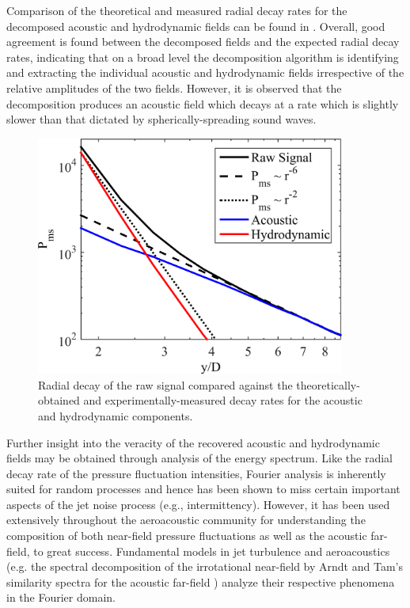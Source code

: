 Comparison of the theoretical and measured radial decay rates for the decomposed acoustic and hydrodynamic fields can be found in .
Overall, good agreement is found between the decomposed fields and the expected radial decay rates, indicating that on a broad level the decomposition algorithm is identifying and extracting the individual acoustic and hydrodynamic fields irrespective of the relative amplitudes of the two fields.
However, it is observed that the decomposition produces an acoustic field which decays at a rate which is slightly slower than that dictated by spherically-spreading sound waves. 
\begin{figure}
	\centering
	\includegraphics[width=4in]{Figures/ch3_validation_Pms.png}
	\caption{Radial decay of the raw signal compared against the theoretically-obtained and experimentally-measured decay rates for the acoustic and hydrodynamic components.}
	\label{fig:ch3_validation_Pms}
\end{figure}

Further insight into the veracity of the recovered acoustic and hydrodynamic fields may be obtained through analysis of the energy spectrum.
Like the radial decay rate of the pressure fluctuation intensities, Fourier analysis is inherently suited for random processes and hence has been shown to miss certain important aspects of the jet noise process (e.g.,  intermittency). 
However, it has been used extensively throughout the aeroacoustic community for understanding the composition of both near-field pressure fluctuations as well as the acoustic far-field, to great success. 
Fundamental models in jet turbulence and aeroacoustics (e.g. the spectral decomposition of the irrotational near-field by Arndt \etal \citep{Arndt1997} and Tam’s similarity spectra for the acoustic far-field \citep{Tam1996}) analyze their respective phenomena in the Fourier domain.

